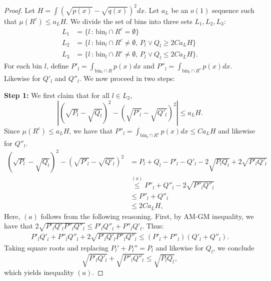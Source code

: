 \documentclass{article}
\newcommand{\bin}{\text{bin}}
\begin{document}
\begin{proof}
Let $H = \int (\sqrt{p(x)} - \sqrt{q(x)})^2 dx$. Let $a_L$ be an $o(1)$ sequence such that $\mu(R^c) \leq a_L H $. We divide the set of bins into three sets $L_1, L_2, L_3$:
\begin{align*}
L_1 &= \{ l\,:\, \bin_l \cap R^c = \emptyset \} \\
L_2 &= \{ l \,:\, \bin_l \cap R^c \neq \emptyset, \, P_l \vee Q_l \geq 2C a_L H \} \\
L_3 &= \{ l \,:\, \bin_l \cap R^c \neq \emptyset, \, P_l \vee Q_l \leq 2C a_L H \}.
\end{align*}
For each bin $l$, define $P'_l = \int_{\bin_l \cap R} p(x) dx$ and $P''_l = \int_{\bin_l \cap R^c} p(x) dx$. Likewise for $Q'_l$ and $Q''_l$. We now proceed in two steps:

\textbf{Step 1:} We first claim that for all $l \in L_2$, 
\[
\left| (\sqrt{P_l} - \sqrt{Q_l})^2 - (\sqrt{P'_l} - \sqrt{Q'_l})^2 \right| \leq a_L H.
\]
Since $\mu(R^c) \leq a_L H$, we have that $P''_l = \int_{\bin_l \cap R^c} p(x) dx \leq C a_L H $ and likewise for $Q''_l$. 
\begin{align*}
(\sqrt{P_l} - \sqrt{Q_l})^2 - (\sqrt{P'_l} - \sqrt{Q'_l})^2 &=
   P_l + Q_l - P'_l - Q'_l - 2 \sqrt{P_l Q_l} + 2 \sqrt{P'_l Q'_l} \\
  &\stackrel{(a)}\leq P''_l + Q''_l - 2 \sqrt{P''_l Q''_l} \\
  &\leq P''_l + Q''_l \\
  &\leq 2 C a_L H,
\end{align*}
Here, $(a)$ follows from the following reasoning. First, by AM-GM inequality, we have that $2 \sqrt{P'_l Q'_l P''_l Q''_l} \leq P'_l Q''_l + P''_l Q'_l$. Thus:
\begin{align*}
P'_l Q'_l + P''_l Q''_l + 2 \sqrt{P'_l Q'_l P''_l Q''_l } \leq (P'_l + P''_l)(Q'_l + Q''_l).
\end{align*}
Taking square roots and replacing $P_l' + P_l'' = P_l$ and likewise for $Q_l$, we conclude 
$$\sqrt{P'_l Q'_l} + \sqrt{P''_l Q''_l}   \leq \sqrt{ P_lQ_l},$$ 
which yields inequality $(a)$.


\end{proof}
\end{document}
